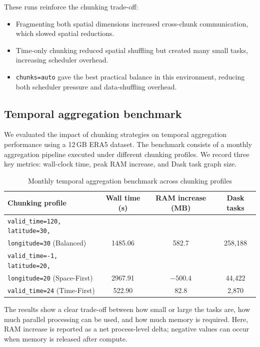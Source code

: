 These runs reinforce the chunking trade-off:
\begin{itemize}
    \item Fragmenting both spatial dimensions increased cross-chunk communication,
    which slowed spatial reductions.
    \item Time-only chunking reduced spatial shuffling but created many small tasks,
    increasing scheduler overhead.
    \item \verb|chunks=auto| gave the best practical balance in this environment,
    reducing both scheduler pressure and data-shuffling overhead.
\end{itemize}

\subsection{Temporal aggregation benchmark}
We evaluated the impact of chunking strategies on temporal aggregation
performance using a 12\,GB ERA5 dataset. The benchmark consists of a monthly
aggregation pipeline executed under different chunking profiles. We record
three key metrics: wall-clock time, peak RAM increase, and Dask task graph
size.

\begin{table}[h]
    \centering
    \small
    \setlength{\tabcolsep}{4pt}
    \renewcommand{\arraystretch}{1.1}
    \caption{Monthly temporal aggregation benchmark across chunking profiles}
    \begin{tabular}{p{}ccc}
        \hline
        Chunking profile & Wall time (s) & RAM increase (MB) & Dask tasks \\
        \hline
        \verb|valid_time=120, latitude=30,|\\ \verb|longitude=30| (Balanced) & 1485.06 & 582.7 & 258,188 \\
        \verb|valid_time=-1, latitude=20,|\\ \verb|longitude=20| (Space-First) & 2967.91 & $-500.4$ & 44,422 \\
        \verb|valid_time=24| (Time-First) & 522.90 & 82.8 & 2,870 \\
        \hline
    \end{tabular}
\end{table}

The results show a clear trade-off between how small or large the tasks are,
    how much parallel processing can be used, and how much memory is required.
    Here, RAM increase is reported as a net process-level delta; negative values
    can occur when memory is released after compute.

